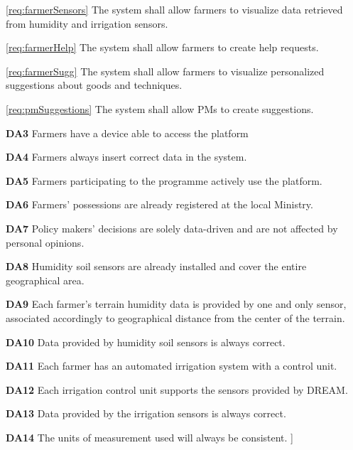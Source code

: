 \documentclass[10pt]{article}
\begin{document}
\begin{description}
\begin{description}
            \item \ref{req:farmerSensors} The system shall allow farmers to visualize data retrieved from humidity and irrigation sensors.
            \item \ref{req:farmerHelp} The system shall allow farmers to create help requests.     
            \item \ref{req:farmerSugg} The system shall allow farmers to visualize personalized suggestions about goods and techniques.
            \item \ref{req:pmSuggestions} The system shall allow PMs to create suggestions.
            \item \textbf{DA3} Farmers have a device able to access the platform
            \item \textbf{DA4} Farmers always insert correct data in the system.
            \item \textbf{DA5} Farmers participating to the programme actively use the platform.
            \item \textbf{DA6} Farmers' possessions are already registered at the local Ministry.
            \item \textbf{DA7} Policy makers' decisions are solely data-driven and are not affected by personal opinions.
            \item \textbf{DA8} Humidity soil sensors are already installed and cover the entire geographical area.
            \item \textbf{DA9} Each farmer's terrain humidity data is provided by one and only sensor, associated accordingly to geographical distance from the center of the terrain.
            \item \textbf{DA10} Data provided by humidity soil sensors is always correct.
            \item \textbf{DA11} Each farmer has an automated irrigation system with a control unit.
            \item \textbf{DA12} Each irrigation control unit supports the sensors provided by DREAM.
            \item \textbf{DA13} Data provided by the irrigation sensors is always correct.
            \item \textbf{DA14} The units of measurement used will always be consistent. ] 
        \end{description}
\end{description}
\newpage
\end{document}
